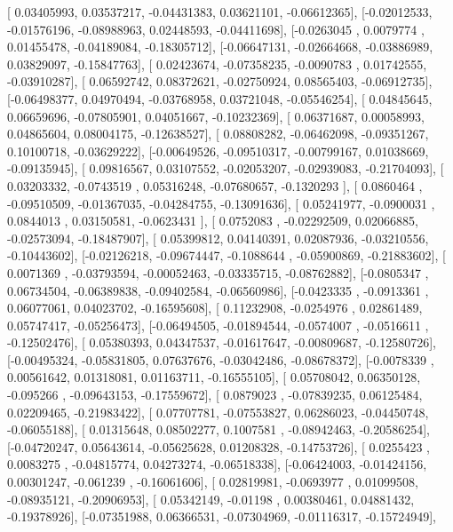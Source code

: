 \documentclass{article}
\begin{document}
       [ 0.03405993,  0.03537217, -0.04431383,  0.03621101, -0.06612365],
       [-0.02012533, -0.01576196, -0.08988963,  0.02448593, -0.04411698],
       [-0.0263045 ,  0.0079774 ,  0.01455478, -0.04189084, -0.18305712],
       [-0.06647131, -0.02664668, -0.03886989,  0.03829097, -0.15847763],
       [ 0.02423674, -0.07358235, -0.0090783 ,  0.01742555, -0.03910287],
       [ 0.06592742,  0.08372621, -0.02750924,  0.08565403, -0.06912735],
       [-0.06498377,  0.04970494, -0.03768958,  0.03721048, -0.05546254],
       [ 0.04845645,  0.06659696, -0.07805901,  0.04051667, -0.10232369],
       [ 0.06371687,  0.00058993,  0.04865604,  0.08004175, -0.12638527],
       [ 0.08808282, -0.06462098, -0.09351267,  0.10100718, -0.03629222],
       [-0.00649526, -0.09510317, -0.00799167,  0.01038669, -0.09135945],
       [ 0.09816567,  0.03107552, -0.02053207, -0.02939083, -0.21704093],
       [ 0.03203332, -0.0743519 ,  0.05316248, -0.07680657, -0.1320293 ],
       [ 0.0860464 , -0.09510509, -0.01367035, -0.04284755, -0.13091636],
       [ 0.05241977, -0.0900031 ,  0.0844013 ,  0.03150581, -0.0623431 ],
       [ 0.0752083 , -0.02292509,  0.02066885, -0.02573094, -0.18487907],
       [ 0.05399812,  0.04140391,  0.02087936, -0.03210556, -0.10443602],
       [-0.02126218, -0.09674447, -0.1088644 , -0.05900869, -0.21883602],
       [ 0.0071369 , -0.03793594, -0.00052463, -0.03335715, -0.08762882],
       [-0.0805347 ,  0.06734504, -0.06389838, -0.09402584, -0.06560986],
       [-0.0423335 , -0.0913361 ,  0.06077061,  0.04023702, -0.16595608],
       [ 0.11232908, -0.0254976 ,  0.02861489,  0.05747417, -0.05256473],
       [-0.06494505, -0.01894544, -0.0574007 , -0.0516611 , -0.12502476],
       [ 0.05380393,  0.04347537, -0.01617647, -0.00809687, -0.12580726],
       [-0.00495324, -0.05831805,  0.07637676, -0.03042486, -0.08678372],
       [-0.0078339 ,  0.00561642,  0.01318081,  0.01163711, -0.16555105],
       [ 0.05708042,  0.06350128, -0.095266  , -0.09643153, -0.17559672],
       [ 0.0879023 , -0.07839235,  0.06125484,  0.02209465, -0.21983422],
       [ 0.07707781, -0.07553827,  0.06286023, -0.04450748, -0.06055188],
       [ 0.01315648,  0.08502277,  0.1007581 , -0.08942463, -0.20586254],
       [-0.04720247,  0.05643614, -0.05625628,  0.01208328, -0.14753726],
       [ 0.0255423 ,  0.0083275 , -0.04815774,  0.04273274, -0.06518338],
       [-0.06424003, -0.01424156,  0.00301247, -0.061239  , -0.16061606],
       [ 0.02819981, -0.0693977 ,  0.01099508, -0.08935121, -0.20906953],
       [ 0.05342149, -0.01198   ,  0.00380461,  0.04881432, -0.19378926],
       [-0.07351988,  0.06366531, -0.07304969, -0.01116317, -0.15724949],
\end{document}
